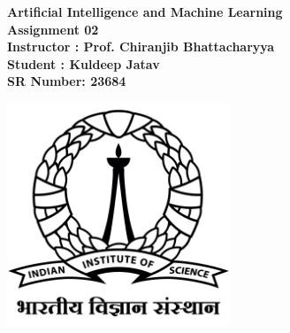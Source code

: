 \documentclass{article}
\begin{document}
    \thispagestyle{empty}
    \begin{center}
        \huge{\textbf{Artificial Intelligence and Machine Learning}} \\ 
        \vspace{1cm}
        \huge{\textbf{Assignment 02}} \\ 
        \vspace{2cm}
        \huge{\textbf{Instructor : Prof. Chiranjib Bhattacharyya}} \\
        \vspace{0.5cm}
        \huge{\textbf{Student : Kuldeep Jatav}} \\
        \vspace{0.5cm}
        \huge{\textbf{SR Number: 23684}} \\ 
        \vspace{3cm}

        \includegraphics[width=0.5\textwidth]{IIScLogo.jpg}
    \end{center}
    
\end{document}
